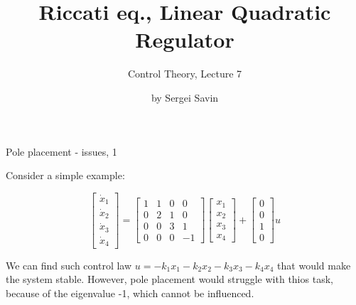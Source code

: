 \documentclass{beamer}
\title{Riccati eq., Linear Quadratic Regulator}
\subtitle{Control Theory, Lecture 7}
\author{by Sergei Savin}
\date{\mydate}
\begin{document}
\maketitle






\begin{frame}{Pole placement - issues, 1}
	\begin{flushleft}
		
		Consider a simple example:
		
		\begin{equation}
			\begin{bmatrix}
				\dot {x}_1 \\ 
				\dot {x}_2 \\ 
				\dot {x}_3 \\ 
				\dot {x}_4 
			\end{bmatrix}
			=
			\begin{bmatrix}
				1 &1 &0 &0\\
				0 &2 &1 &0\\
				0 &0 &3 &1\\
				0 &0 &0 &-1
			\end{bmatrix}
			\begin{bmatrix}
			x_1 \\ 
			x_2 \\ 
			x_3 \\ 
			x_4 
			\end{bmatrix}
			+
			\begin{bmatrix}
				0 \\ 
				0 \\ 
				1 \\ 
				0 
			\end{bmatrix}
			u
		\end{equation}
		
		We can find such control law $u = - k_1 x_1- k_2 x_2- k_3 x_3- k_4x_4$ that would make the system stable. However, pole placement would struggle with thios task, because of the eigenvalue -1, which cannot be influenced.
		
		
	\end{flushleft}
\end{frame}
\end{document}
